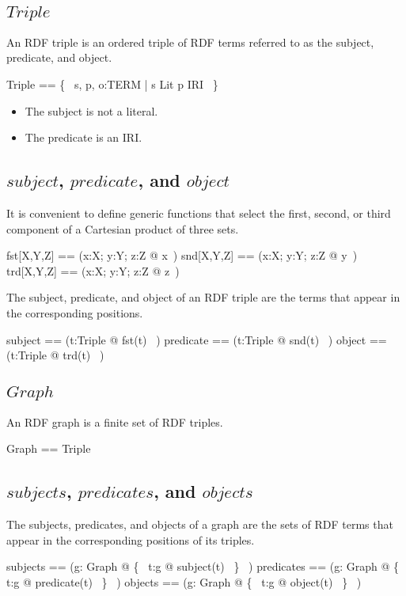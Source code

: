 \documentclass{article}
\begin{document}
\subsection{$Triple$}
An RDF triple is an ordered triple of RDF terms referred to as the subject, predicate, and object.
\begin{zed}
	Triple == \{~ s, p, o:TERM | s \notin Lit \land p \in IRI ~\}
\end{zed}
\begin{itemize}
\item The subject is not a literal.
\item The predicate is an IRI.
\end{itemize}

\subsection{$subject$, $predicate$, and $object$}
It is convenient to define generic functions that select the first, second, or third component of a Cartesian product of three sets.
\begin{zed}
	fst[X,Y,Z] == (\lambda x:X; y:Y; z:Z @ x~)
\also
	snd[X,Y,Z] == (\lambda x:X; y:Y; z:Z @ y~)
\also
	trd[X,Y,Z] == (\lambda x:X; y:Y; z:Z @ z~)
\end{zed}

The subject, predicate, and object of an RDF triple are the terms that appear in the corresponding positions.
\begin{zed}
	subject == (\lambda t:Triple @ fst(t) ~)
\also
	predicate == (\lambda t:Triple @ snd(t) ~)
\also
	object == (\lambda t:Triple @ trd(t) ~)
\end{zed}

\subsection{$Graph$}
An RDF graph is a finite set of RDF triples.
\begin{zed}
	Graph == \finset Triple
\end{zed}

\subsection{$subjects$, $predicates$, and $objects$}
The subjects, predicates, and objects of a graph are the sets of RDF terms that appear in the corresponding positions of its triples.
\begin{zed}
	subjects == (\lambda g: Graph @ \{~ t:g @ subject(t) ~\} ~)
\also
	predicates == (\lambda g: Graph @ \{~ t:g @ predicate(t) ~\} ~)
\also
	objects == (\lambda g: Graph @ \{~ t:g @ object(t) ~\} ~)
\end{zed}
\end{document}
